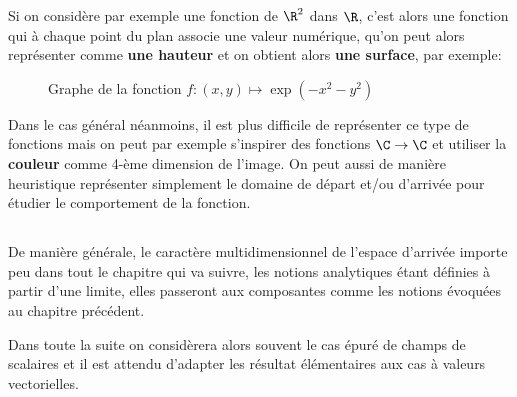Si on considère par exemple une fonction de \(\R^2\) dans \(\R\), c'est alors une fonction qui à chaque point du plan associe une valeur numérique, qu'on peut alors représenter comme \textbf{une hauteur} et on obtient alors \textbf{une surface}, par exemple:

\begin{figure}
   \centering
   \vspace*{-0.5cm}
   \captionsetup{labelformat=empty}
   \caption{Graphe de la fonction \(f : (x, y) \mapsto \exp(-x^2 - y^2)\)}
\end{figure}
\pagebreak

Dans le cas général néanmoins, il est plus difficile de représenter ce type de fonctions mais on peut par exemple s'inspirer des fonctions \(\C \rightarrow \C\) et utiliser la \textbf{couleur} comme 4-ème dimension de l'image. On peut aussi de manière heuristique représenter simplement le domaine de départ et/ou d'arrivée pour étudier le comportement de la fonction.

\subsection*{}
De manière générale, le caractère multidimensionnel de l'espace d'arrivée importe peu dans tout le chapitre qui va suivre, les notions analytiques étant définies à partir d'une limite, elles passeront aux composantes comme les notions évoquées au chapitre précédent.\<

Dans toute la suite on considèrera alors souvent le cas épuré de champs de scalaires et il est attendu d'adapter les résultat élémentaires aux cas à valeurs vectorielles.

